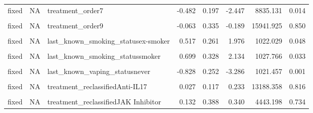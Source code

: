 \begin{table}[!h]
\begin{tabular}[t]{lllrrrrr}
fixed & NA & treatment\_order7 & -0.482 & 0.197 & -2.447 & 8835.131 & 0.014\\
\cellcolor{gray!10}{fixed} & \cellcolor{gray!10}{NA} & \cellcolor{gray!10}{treatment\_order8} & \cellcolor{gray!10}{-0.941} & \cellcolor{gray!10}{0.284} & \cellcolor{gray!10}{-3.315} & \cellcolor{gray!10}{16009.010} & \cellcolor{gray!10}{0.001}\\
fixed & NA & treatment\_order9 & -0.063 & 0.335 & -0.189 & 15941.925 & 0.850\\
\cellcolor{gray!10}{fixed} & \cellcolor{gray!10}{NA} & \cellcolor{gray!10}{treatment\_order11} & \cellcolor{gray!10}{1.429} & \cellcolor{gray!10}{0.508} & \cellcolor{gray!10}{2.814} & \cellcolor{gray!10}{13839.047} & \cellcolor{gray!10}{0.005}\\
\addlinespace
fixed & NA & last\_known\_smoking\_statusex-smoker & 0.517 & 0.261 & 1.976 & 1022.029 & 0.048\\
\cellcolor{gray!10}{fixed} & \cellcolor{gray!10}{NA} & \cellcolor{gray!10}{last\_known\_smoking\_statusnever} & \cellcolor{gray!10}{0.353} & \cellcolor{gray!10}{0.262} & \cellcolor{gray!10}{1.349} & \cellcolor{gray!10}{1023.428} & \cellcolor{gray!10}{0.178}\\
fixed & NA & last\_known\_smoking\_statussmoker & 0.699 & 0.328 & 2.134 & 1027.766 & 0.033\\
\cellcolor{gray!10}{fixed} & \cellcolor{gray!10}{NA} & \cellcolor{gray!10}{last\_known\_vaping\_statusex-vaper} & \cellcolor{gray!10}{-1.997} & \cellcolor{gray!10}{0.596} & \cellcolor{gray!10}{-3.353} & \cellcolor{gray!10}{1043.757} & \cellcolor{gray!10}{0.001}\\
fixed & NA & last\_known\_vaping\_statusnever & -0.828 & 0.252 & -3.286 & 1021.457 & 0.001\\
\addlinespace
\cellcolor{gray!10}{fixed} & \cellcolor{gray!10}{NA} & \cellcolor{gray!10}{last\_known\_vaping\_statusvaper} & \cellcolor{gray!10}{-0.608} & \cellcolor{gray!10}{0.369} & \cellcolor{gray!10}{-1.649} & \cellcolor{gray!10}{1021.610} & \cellcolor{gray!10}{0.099}\\
fixed & NA & treatment\_reclassifiedAnti-IL17 & 0.027 & 0.117 & 0.233 & 13188.358 & 0.816\\
\cellcolor{gray!10}{fixed} & \cellcolor{gray!10}{NA} & \cellcolor{gray!10}{treatment\_reclassifiedAnti-TNF} & \cellcolor{gray!10}{-0.087} & \cellcolor{gray!10}{0.072} & \cellcolor{gray!10}{-1.214} & \cellcolor{gray!10}{14778.733} & \cellcolor{gray!10}{0.225}\\
fixed & NA & treatment\_reclassifiedJAK Inhibitor & 0.132 & 0.388 & 0.340 & 4443.198 & 0.734\\

\end{tabular}
\end{table}
